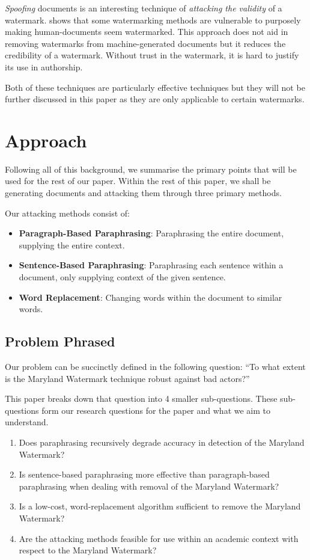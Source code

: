 \documentclass{l4proj}
\theoremstyle{definition}
\begin{document}
        \emph{Spoofing} documents is an interesting technique of \emph{attacking the validity} of a watermark. \citet{sadasivan2023aigenerated} shows that some watermarking methods are vulnerable to purposely making human-documents seem watermarked. This approach does not aid in removing watermarks from machine-generated documents but it reduces the credibility of a watermark. Without trust in the watermark, it is hard to justify its use in authorship.

        Both of these techniques are particularly effective techniques but they will not be further discussed in this paper as they are only applicable to certain watermarks. 

\section{Approach}  
    Following all of this background, we summarise the primary points that will be used for the rest of our paper. Within the rest of this paper, we shall be generating documents and attacking them through three primary methods.

    Our attacking methods consist of:
    \begin{itemize}
        \setlength\itemsep{0.5em}
        \item \textbf{Paragraph-Based Paraphrasing}: Paraphrasing the entire document, supplying the entire context. 
        \item \textbf{Sentence-Based Paraphrasing}: Paraphrasing each sentence within a document, only supplying context of the given sentence.
        \item \textbf{Word Replacement}: Changing words within the document to similar words.
    \end{itemize}

    \subsection{Problem Phrased}
        Our problem can be succinctly defined in the following question: ``To what extent is the Maryland Watermark technique robust against bad actors?''

        This paper breaks down that question into 4 smaller sub-questions. These sub-questions form our research questions for the paper and what we aim to understand.
        \begin{enumerate}[label={\textbf{RQ\arabic*}:}, leftmargin=4em]
            \label{sec:research-questions}
            \item Does paraphrasing recursively degrade accuracy in detection of the Maryland Watermark?
            \item Is sentence-based paraphrasing more effective than paragraph-based paraphrasing when dealing with removal of the Maryland Watermark?
            \item Is a low-cost, word-replacement algorithm sufficient to remove the Maryland Watermark? 
            \item Are the attacking methods feasible for use within an academic context with respect to the Maryland Watermark?
        \end{enumerate}
\end{document}
